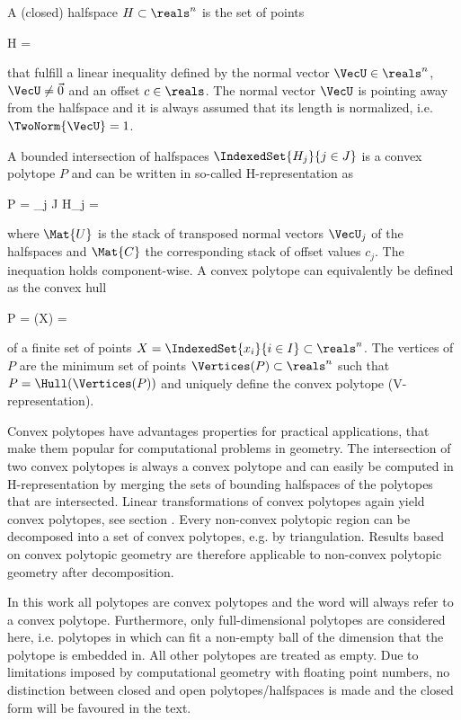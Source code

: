 A (closed) halfspace $H \subset \reals^n$ is the set of points

\startformula
    H = 
\stopformula

that fulfill a linear inequality defined by the normal vector $\VecU \in \reals^n$, $\VecU \neq \Vec{0}$ and an offset $c \in \reals$.
The normal vector $\VecU$ is pointing away from the halfspace and it is always assumed that its length is normalized, i.e. $\TwoNorm{\VecU} = 1$.

A bounded intersection of halfspaces $\IndexedSet{H_j}{j \in J}$ is a convex polytope $P$ and can be written in so-called H-representation as

\startformula
    P = \bigcup_{j \in J} H_j =  \EndComma
\stopformula

where $\Mat{U}$ is the stack of transposed normal vectors $\VecU_j$ of the halfspaces and $\Mat{C}$ the corresponding stack of offset values $c_j$.
The inequation holds component-wise.
A convex polytope can equivalently be defined as the convex hull

\startformula
    P = \Hull(X) = 
\stopformula

of a finite set of points $X = \IndexedSet{x_i}{i \in I} \subset \reals^n$.
The vertices of $P$ are the minimum set of points $\Vertices(P) \subset \reals^n$ such that $P = \Hull({\Vertices(P)})$ and uniquely define the convex polytope (V-representation).


\startsubsection[title={Properties of Convex Polytopes}]

    Convex polytopes have advantages properties for practical applications, that make them popular for computational problems in geometry.
    The intersection of two convex polytopes is always a convex polytope and can easily be computed in H-representation by merging the sets of bounding halfspaces of the polytopes that are intersected.
    Linear transformations of convex polytopes again yield convex polytopes, see section .
    Every non-convex polytopic region can be decomposed into a set of convex polytopes, e.g. by triangulation.
    Results based on convex polytopic geometry are therefore applicable to non-convex polytopic geometry after decomposition.

    In this work all polytopes are convex polytopes and the word  will always refer to a convex polytope.
    Furthermore, only full-dimensional polytopes are considered here, i.e. polytopes in which can fit a non-empty ball of the dimension that the polytope is embedded in.
    All other polytopes are treated as empty.
    Due to limitations imposed by computational geometry with floating point numbers, no distinction between closed and open polytopes/halfspaces is made and the closed form will be favoured in the text.

